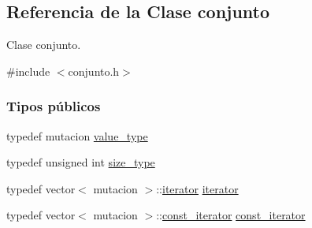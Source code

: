 \hypertarget{classconjunto}{}\subsection{Referencia de la Clase conjunto}
\label{classconjunto}


Clase conjunto.  




{\ttfamily \#include $<$conjunto.\+h$>$}

\subsubsection*{Tipos públicos}
\begin{DoxyCompactItemize}
\item 
typedef mutacion \hyperlink{classconjunto_ad902faf0206fe6aa37e39d8e6e5a880a}{value\+\_\+type}
\item 
typedef unsigned int \hyperlink{classconjunto_a855a5893bb0f5a851ab2dbf2b8aa6cc7}{size\+\_\+type}
\item 
typedef vector$<$ mutacion $>$\+::\hyperlink{classconjunto_a6de33afebdfa3ec058e9c78f28854311}{iterator} \hyperlink{classconjunto_a6de33afebdfa3ec058e9c78f28854311}{iterator}
\item 
typedef vector$<$ mutacion $>$\+::\hyperlink{classconjunto_aa3cf9f1ee3fc1682b221c33d9f271e2e}{const\+\_\+iterator} \hyperlink{classconjunto_aa3cf9f1ee3fc1682b221c33d9f271e2e}{const\+\_\+iterator}
\end{DoxyCompactItemize}
